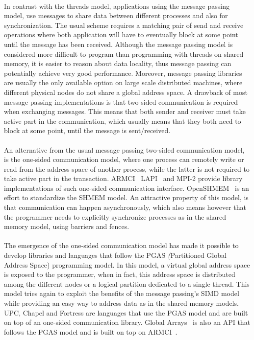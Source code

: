 \paragraph{}
In contrast with the threads model,  applications using the message passing model, use messages to share data
between different processes and also for synchronization.  The usual scheme requires a matching pair
of send and receive operations where both application will have to eventually block at some point until
the message has been received. Although the message passing model is considered more difficult to program 
than programming with threads on shared memory, it is easier to reason about data locality, thus message passing can 
potentially achieve very good performance.  Moreover, message passing libraries are usually the only 
available option on large scale distributed machines, where different physical nodes do not share 
a global address space.  A drawback of most message passing implementations is that two-sided 
communication is required when exchanging messages.  This means that both sender and receiver must
take active part in the communication, which usually means that they both need to block at some point,
until the message is sent/received.  

\paragraph{}
An alternative from the usual message passing two-sided communication model, 
is the one-sided communication model, where one process can remotely write
or read from the address space of another process, while the latter is not required 
to take active part in the transaction.  ARMCI~\cite{Nieplocha99armci:a} 
LAPI~\cite{Shah:1998:PEL:876880.879642} and MPI-2 provide library implementations of such 
one-sided communication interface. OpenSHMEM~\cite{Chapman:2010:IOS:2020373.2020375} is 
an effort to standardize the SHMEM model. An attractive property of this model, is that communication can happen 
asynchronously, which also means however that the programmer needs to explicitly synchronize
processes as in the shared memory model, using barriers and fences.  

\paragraph{}
The emergence of the one-sided communication model has made it possible to develop libraries and languages
that follow the PGAS \emph(Partitioned Global Address Space) programming model.  In this model,
a virtual global address space is exposed to the programmer, when in fact, this address space is 
distributed among the different nodes or a logical partition dedicated to a single thread.  
This model tries again to exploit the benefits of the message passing's SIMD model while providing
an easy way to address data as in the shared memory models.  UPC, Chapel and Fortress are languages
that use the PGAS model and are built on top of an one-sided communication library.  
Global Arrays~\cite{Nieplocha:2006:AAP:1125980.1125985} is also
an API that follows the PGAS model and is built on top on ARMCI~\cite{Nieplocha99armci:a}. 

